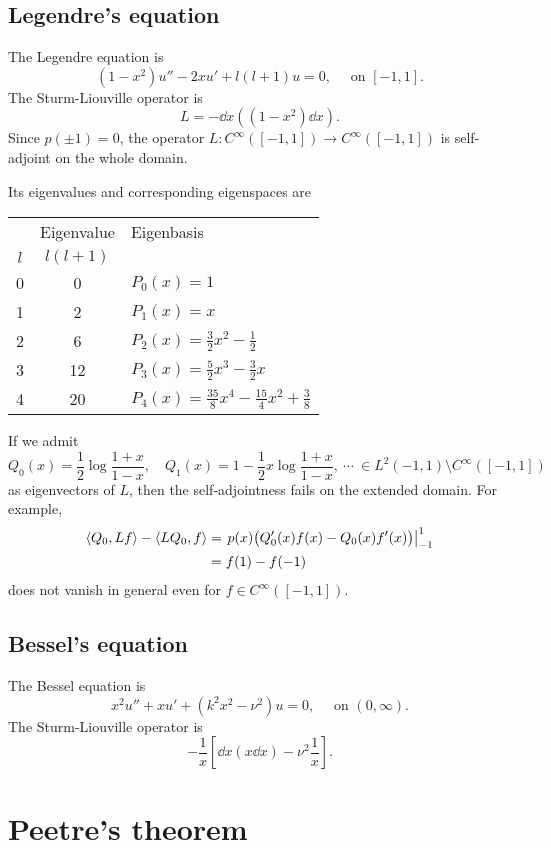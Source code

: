 \documentclass[11pt]{article}
\let\realsection\section
\renewcommand\section{\newpage\realsection}
\begin{document}
\subsection{Legendre's equation}
The Legendre equation is
\[(1-x^2)u''-2xu'+l(l+1)u=0,\quad\text{ on }[-1,1].\]
The Sturm-Liouville operator is
\[L=-\dd{x}\left((1-x^2)\dd{x}\right).\]
Since $p(\pm1)=0$, the operator $L:C^\infty([-1,1])\to C^\infty([-1,1])$ is self-adjoint on the whole domain.


Its eigenvalues and corresponding eigenspaces are
\begin{center}\renewcommand{\arraystretch}{1.2}
\begin{tabular}{c|c|l}
\hline
    & Eigenvalue & Eigenbasis \\
$l$ & $l(l+1)$   & \\
\hline
0   & 0          & $P_0(x)=1$ \\
1   & 2          & $P_1(x)=x$ \\
2   & 6          & $P_2(x)=\frac32x^2-\frac12$ \\
3   & 12         & $P_3(x)=\frac52x^3-\frac32x$ \\
4   & 20         & $P_4(x)=\frac{35}8x^4-\frac{15}4x^2+\frac38$\\
\hline
\end{tabular}
\end{center}
If we admit
\[Q_0(x)=\frac12\log\frac{1+x}{1-x},\quad Q_1(x)=1-\frac12x\log\frac{1+x}{1-x},\ \cdots\ \in L^2(-1,1)\setminus C^\infty([-1,1])\]
as eigenvectors of $L$, then the self-adjointness fails on the extended domain.
For example,
\begin{align*}
\langle Q_0,Lf\rangle-\langle LQ_0,f\rangle
&=\left.p(x)\bigl(Q_0'(x)f(x)-Q_0(x)f'(x)\bigr)\right|_{-1}^1\\
&=f(1)-f(-1)
\end{align*}
does not vanish in general even for $f\in C^\infty([-1,1])$.

\subsection{Bessel's equation}
The Bessel equation is
\[x^2u''+xu'+(k^2x^2-\nu^2)u=0,\quad\text{ on }(0,\infty).\]
The Sturm-Liouville operator is
\[-\frac1x\left[\dd{x}\left(x\dd{x}\right)-\nu^2\frac1x\right].\]





\section{Peetre's theorem}
\end{document}
